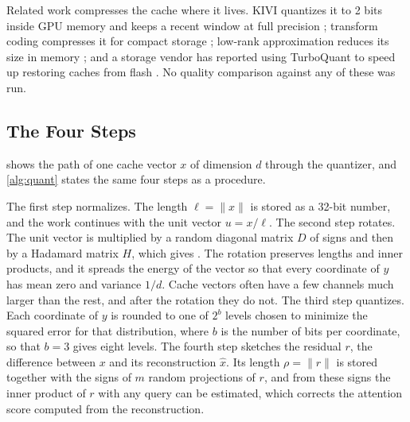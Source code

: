 Related work compresses the cache where it lives. KIVI quantizes it to 2 bits inside GPU memory and keeps a recent window at
full precision \citep{liu2024kivi}; transform coding compresses it for
compact storage \citep{staniszewski2026kvtc}; low-rank approximation reduces
its size in memory \citep{zhang2024lorc}; and a storage vendor has
reported using TurboQuant to speed up restoring caches from flash
\citep{alvarez2026flashblade}. No quality comparison against any of these was
run.

\subsection{The Four Steps}

 shows the path of one cache vector $x$ of dimension
$d$ through the quantizer, and \cref{alg:quant} states the same four steps as
a procedure.

The first step normalizes. The length $\ell = \lVert x \rVert$ is stored as
a 32-bit number, and the work continues with the unit vector $u = x / \ell$.
The second step rotates. The unit vector is multiplied by a random diagonal
matrix $D$ of signs and then by a Hadamard matrix $H$, which gives
.
The rotation preserves lengths and inner products, and it spreads the energy
of the vector so that every coordinate of $y$ has mean zero and variance
$1/d$. Cache vectors often have a few channels much larger than the rest, and
after the rotation they do not. The third step quantizes. Each coordinate of
$y$ is rounded to one of $2^b$ levels chosen to minimize the squared error
for that distribution, where $b$ is the number of bits per coordinate, so
that $b = 3$ gives eight levels. The fourth step sketches the residual $r$,
the difference between $x$ and its reconstruction $\hat x$. Its length
$\rho = \lVert r \rVert$ is stored together with the signs of $m$ random
projections of $r$, and from these signs the inner product of $r$ with any
query can be estimated, which corrects the attention score computed from the
reconstruction.


